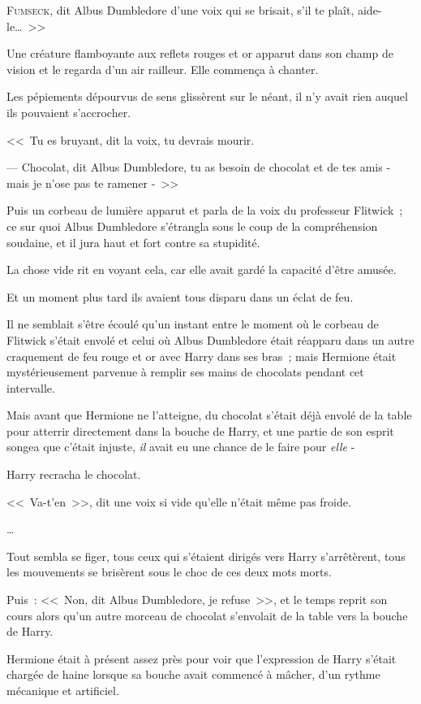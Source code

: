 
\lettrine[ante=<<~]{F}{umseck}, dit Albus Dumbledore d'une voix qui se brisait, s'il te plaît, aide-le…~>>

Une créature flamboyante aux reflets rouges et or apparut dans son champ de vision et le regarda d'un air railleur. Elle commença à chanter.

Les pépiements dépourvus de sens glissèrent sur le néant, il n'y avait rien auquel ils pouvaient s'accrocher.

<<~Tu es bruyant, dit la voix, tu devrais mourir.

--- Chocolat, dit Albus Dumbledore, tu as besoin de chocolat et de tes amis - mais je n'ose pas te ramener -~>>

Puis un corbeau de lumière apparut et parla de la voix du professeur Flitwick~; ce sur quoi Albus Dumbledore s'étrangla sous le coup de la compréhension soudaine, et il jura haut et fort contre sa stupidité.

La chose vide rit en voyant cela, car elle avait gardé la capacité d'être amusée.

\later

Et un moment plus tard ils avaient tous disparu dans un éclat de feu.

Il ne semblait s'être écoulé qu'un instant entre le moment où le corbeau de Flitwick s'était envolé et celui où Albus Dumbledore était réapparu dans un autre craquement de feu rouge et or avec Harry dans ses bras~; mais Hermione était mystérieusement parvenue à remplir ses mains de chocolats pendant cet intervalle.

Mais avant que Hermione ne l'atteigne, du chocolat s'était déjà envolé de la table pour atterrir directement dans la bouche de Harry, et une partie de son esprit songea que c'était injuste, \emph{il} avait eu une chance de le faire pour \emph{elle} -

Harry recracha le chocolat.

<<~Va-t'en~>>, dit une voix si vide qu'elle n'était même pas froide.

…

Tout sembla se figer, tous ceux qui s'étaient dirigés vers Harry s'arrêtèrent, tous les mouvements se brisèrent sous le choc de ces deux mots morts.

Puis~: <<~Non, dit Albus Dumbledore, je refuse~>>, et le temps reprit son cours alors qu'un autre morceau de chocolat s'envolait de la table vers la bouche de Harry.

Hermione était à présent assez près pour voir que l'expression de Harry s'était chargée de haine lorsque sa bouche avait commencé à mâcher, d'un rythme mécanique et artificiel.

